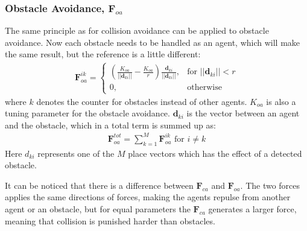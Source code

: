 \documentclass[a4paper,conference]{IEEEtran}
\begin{document}
\subsubsection{Obstacle Avoidance, $\mathbf{F}_{oa}$}
The same principle as for collision avoidance can be applied to
obstacle avoidance. Now each obstacle needs to be handled as an agent,
which will make the same result, but the reference is a little
different:
\begin{align}
    \mathbf{F}_{oa}^{ik}= 
\begin{cases}
    \left( \frac{K_{oa}}{||\mathbf{d}_{ki}||}-\frac{K_{oa}}{r}\right)
		\frac{\mathbf{d}_{{ki}}}{||\mathbf{d}_{ki}||},& \text{for } ||\mathbf{d}_{ki}||<r\\
    0,              & \text{otherwise}
\end{cases}
\end{align}
where $k$ denotes the counter for obstacles instead of other agents.
$K_{oa}$ is also a tuning parameter for the obstacle avoidance.
$\mathbf{d}_{ki}$ is the vector between an agent and the obstacle, which in a
total term is summed up as:
\begin{align}
\mathbf{F}_{oa}^{tot} = \sum\limits_{k=1}^M\mathbf{F}_{oa}^{ik} \text{ for } i\neq k
\end{align}
Here $d_{ki}$ represents one of the $M$ place vectors which has the
effect of a detected obstacle.

It can be noticed that there is a difference between $\mathbf{F}_{ca}$
and $\mathbf{F}_{oa}$. The two forces applies the same directions of
forces, making the agents repulse from another agent or an obstacle, but for equal parameters the $\mathbf{F}_{ca}$ generates a larger force, meaning that collision is punished harder than obstacles. 


\end{document}
